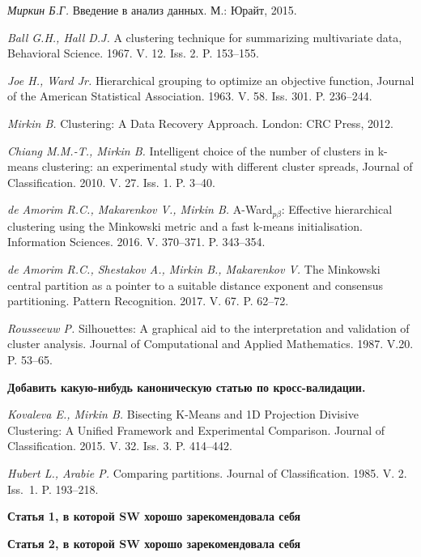 \documentclass[12pt]{a&t}
\begin{document}
\begin{thebibliography}{10}


{\it Миркин Б.Г.}
Введение в анализ данных. М.: Юрайт, 2015.

{\it Ball G.H., Hall D.J.}
A clustering technique for summarizing multivariate data, Behavioral Science. 1967. V. 12. Iss. 2. P. 153--155.

{\it Joe H., Ward Jr.}
Hierarchical grouping to optimize an objective function, Journal of the American Statistical Association. 1963. V. 58. Iss. 301. P. 236--244.

{\it Mirkin B.}
Clustering: A Data Recovery Approach. London: CRC Press, 2012.

{\it Chiang M.M.-T., Mirkin B.}
Intelligent choice of the number of clusters in k-means clustering: an experimental study with different cluster spreads, Journal of Classification. 2010. V. 27. Iss. 1. P. 3--40.

{\it de Amorim R.C., Makarenkov V., Mirkin B.}
\mbox{A-Ward$ _{p\beta} $}: Effective hierarchical clustering using the Minkowski metric and a fast \mbox{k-means} initialisation. Information Sciences. 2016. V. 370--371. P. 343--354.

{\it de Amorim R.C., Shestakov A., Mirkin B., Makarenkov V.}
The Minkowski central partition as a pointer to a suitable distance exponent and consensus partitioning. Pattern Recognition. 2017. V. 67. P. 62--72.

{\it Rousseeuw P.}
Silhouettes: A graphical aid to the interpretation and validation of cluster analysis. Journal of Computational and Applied Mathematics. 1987. V.20. P. 53--65.

\textbf{Добавить какую-нибудь каноническую статью по кросс-валидации.}

{\it Kovaleva E., Mirkin B.}
Bisecting K-Means and 1D Projection Divisive Clustering: A Unified Framework and Experimental Comparison. Journal of Classification. 2015. V. 32. Iss. 3. P. 414--442.

{\it Hubert L., Arabie P.}
Comparing partitions. Journal of Classification. 1985. V. 2. \mbox{Iss. 1.} P. 193--218.

\textbf{Статья 1, в которой SW хорошо зарекомендовала себя}

\textbf{Статья 2, в которой SW хорошо зарекомендовала себя}
\end{thebibliography}


\end{document}
